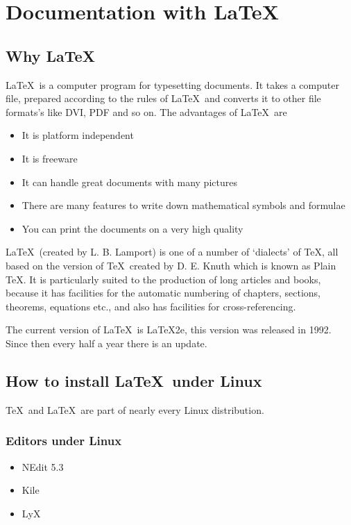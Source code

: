 
\chapter{Documentation with \LaTeX}


\section{Why \LaTeX}

\LaTeX\ is a computer program for typesetting documents.  It
takes a computer file, prepared according to the rules of
\LaTeX\, and converts it to other file formats's like DVI, PDF and so on.
The advantages of \LaTeX\ are
\begin{itemize}
\item It is platform independent
\item It is freeware
\item It can handle great documents with many pictures
\item There are many features to write down mathematical symbols and formulae
\item You can print the documents on a very high quality
\end{itemize}

\LaTeX\ (created by L. B. Lamport) is one of a number of `dialects' of \TeX, all based %
on the
version of \TeX\ created by D. E. Knuth which is known as Plain \TeX.
It is particularly suited to the production of long articles and books, because it has
facilities for the automatic numbering of chapters, sections, theorems, equations etc., 
and also has facilities for cross-referencing.

The current version of \LaTeX\ is \LaTeX2e, this version was released in
1992. Since then every half a year there is an update.


\section{How to install \LaTeX\ under Linux}

\TeX\ and \LaTeX\ are part of nearly every Linux distribution.

\subsection{Editors under Linux}

\begin{itemize}
\item NEdit 5.3
\item Kile
\item LyX
\end{itemize}

